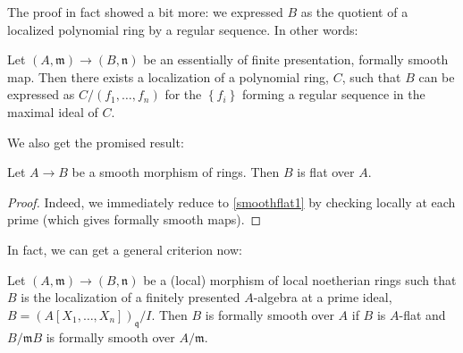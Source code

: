 The proof in fact showed a bit more: we expressed $B$ as the quotient of a
localized 
polynomial ring by a regular sequence. 
In other words:

\begin{corollary}
Let $(A, \mathfrak{m}) \to (B, \mathfrak{n})$ be an essentially of
finite presentation, formally smooth map. Then there exists a localization
of a polynomial ring, $C$, such that $B$ can be expressed as
$C/(f_1, \dots, f_n)$ for the $\left\{f_i\right\}$ forming  a regular
sequence in the maximal ideal of $C$.
\end{corollary} 

We also get the promised result:
\begin{theorem} \label{smoothflat}
Let $A \to B$ be a smooth morphism of rings. Then $B$ is flat over $A$.
\end{theorem} 
\begin{proof} 
Indeed, we immediately reduce to \cref{smoothflat1} by checking locally at each
prime (which gives formally smooth maps).
\end{proof} 

In fact, we can get a general criterion now:

\begin{theorem} \label{fiberwisesmooth}
Let $(A, \mathfrak{m}) \to (B, \mathfrak{n})$ be a (local) morphism of local
noetherian rings such that $B$ is the localization of a finitely presented $A$-algebra at a prime
ideal, $B = (A[X_1, \dots, X_n])_{\mathfrak{q}}/I$. Then $B$ is formally
smooth over $A$ if $B$ is $A$-flat and $B/\mathfrak{m}B$ is formally smooth
over $A/\mathfrak{m}$.
\end{theorem} 

